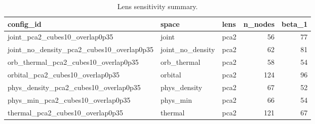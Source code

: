 \begin{table}
\caption{Lens sensitivity summary.}
\label{tab:mapper_lens_sensitivity}
\begin{tabular}{lllrr}
\toprule
config\_id & space & lens & n\_nodes & beta\_1 \\
\midrule
joint\_pca2\_cubes10\_overlap0p35 & joint & pca2 & 56 & 77 \\
joint\_no\_density\_pca2\_cubes10\_overlap0p35 & joint\_no\_density & pca2 & 62 & 81 \\
orb\_thermal\_pca2\_cubes10\_overlap0p35 & orb\_thermal & pca2 & 58 & 54 \\
orbital\_pca2\_cubes10\_overlap0p35 & orbital & pca2 & 124 & 96 \\
phys\_density\_pca2\_cubes10\_overlap0p35 & phys\_density & pca2 & 67 & 52 \\
phys\_min\_pca2\_cubes10\_overlap0p35 & phys\_min & pca2 & 66 & 54 \\
thermal\_pca2\_cubes10\_overlap0p35 & thermal & pca2 & 121 & 67 \\
\bottomrule
\end{tabular}
\end{table}
